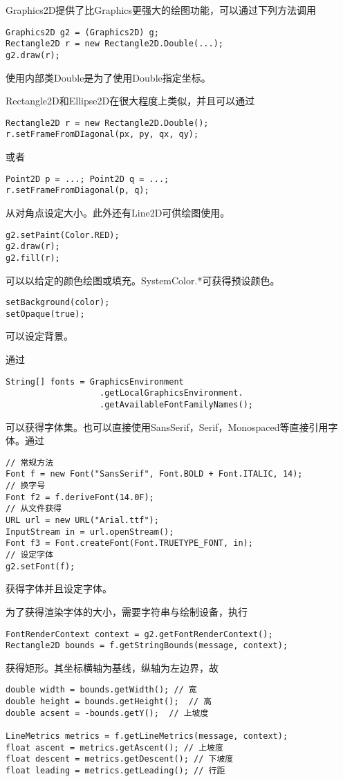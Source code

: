 \documentclass{ctexart}
\begin{document}
Graphics2D提供了比Graphics更强大的绘图功能，可以通过下列方法调用
\begin{lstlisting}
Graphics2D g2 = (Graphics2D) g;
Rectangle2D r = new Rectangle2D.Double(...);
g2.draw(r);
\end{lstlisting}
使用内部类Double是为了使用Double指定坐标。
\par
Rectangle2D和Ellipse2D在很大程度上类似，并且可以通过
\begin{lstlisting}
Rectangle2D r = new Rectangle2D.Double();
r.setFrameFromDIagonal(px, py, qx, qy);
\end{lstlisting}
或者
\begin{lstlisting}
Point2D p = ...; Point2D q = ...;
r.setFrameFromDiagonal(p, q);
\end{lstlisting}
从对角点设定大小。此外还有Line2D可供绘图使用。
\begin{lstlisting}
g2.setPaint(Color.RED);
g2.draw(r);
g2.fill(r);
\end{lstlisting}
\par
可以以给定的颜色绘图或填充。SystemColor.*可获得预设颜色。
\begin{lstlisting}
setBackground(color);
setOpaque(true);
\end{lstlisting}
可以设定背景。
\par
通过
\begin{lstlisting}
String[] fonts = GraphicsEnvironment
                   .getLocalGraphicsEnvironment.
                   .getAvailableFontFamilyNames();
\end{lstlisting}
可以获得字体集。也可以直接使用SansSerif，Serif，Monospaced等直接引用字体。通过
\begin{lstlisting}
// 常规方法
Font f = new Font("SansSerif", Font.BOLD + Font.ITALIC, 14);
// 换字号
Font f2 = f.deriveFont(14.0F);
// 从文件获得
URL url = new URL("Arial.ttf");
InputStream in = url.openStream();
Font f3 = Font.createFont(Font.TRUETYPE_FONT, in);
// 设定字体
g2.setFont(f);
\end{lstlisting}
获得字体并且设定字体。
\par
为了获得渲染字体的大小，需要字符串与绘制设备，执行
\begin{lstlisting}
FontRenderContext context = g2.getFontRenderContext();
Rectangle2D bounds = f.getStringBounds(message, context);
\end{lstlisting}
获得矩形。其坐标横轴为基线，纵轴为左边界，故
\begin{lstlisting}
double width = bounds.getWidth(); // 宽
double height = bounds.getHeight();  // 高
double acsent = -bounds.getY();  // 上坡度

LineMetrics metrics = f.getLineMetrics(message, context);
float ascent = metrics.getAscent(); // 上坡度
float descent = metrics.getDescent(); // 下坡度
float leading = metrics.getLeading(); // 行距
\end{lstlisting}
\end{document}
